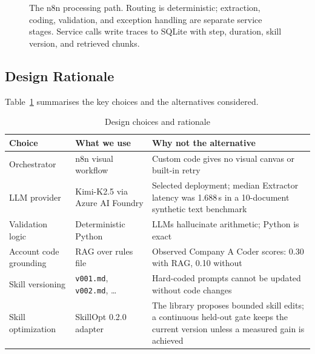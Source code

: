 \begin{figure}[ht]
\caption{The n8n processing path. Routing is deterministic; extraction, coding,
validation, and exception handling are separate service stages. Service calls
write traces to SQLite with step, duration, skill version, and retrieved chunks.}
\label{fig:pipeline}
\end{figure}

\subsection{Design Rationale}

Table~\ref{tab:design} summarises the key choices and the alternatives considered.

\begin{table}[ht]
\caption{Design choices and rationale}
\label{tab:design}
\centering\scriptsize\renewcommand{\arraystretch}{1.25}
\begin{tabularx}{\columnwidth}{@{}lXX@{}}
\toprule
\textbf{Choice} & \textbf{What we use} & \textbf{Why not the alternative} \\
\midrule
Orchestrator & n8n visual workflow & Custom code gives no visual canvas or
                                     built-in retry \\
LLM provider & Kimi-K2.5 via Azure AI Foundry &
               Selected deployment; median Extractor latency was 1.688\,s in a
               10-document synthetic text benchmark \\
Validation logic & Deterministic Python & LLMs hallucinate arithmetic; Python
                                         is exact \\
Account code grounding & RAG over rules file &
               Observed Company A Coder scores: 0.30 with RAG, 0.10 without \\
Skill versioning & \texttt{v001.md}, \texttt{v002.md}, \ldots &
               Hard-coded prompts cannot be updated without code changes \\
Skill optimization & SkillOpt 0.2.0 adapter & The library proposes bounded
                                skill edits; a continuous held-out gate keeps
                                the current version unless a measured gain is
                                achieved \\
\bottomrule
\end{tabularx}
\end{table}

